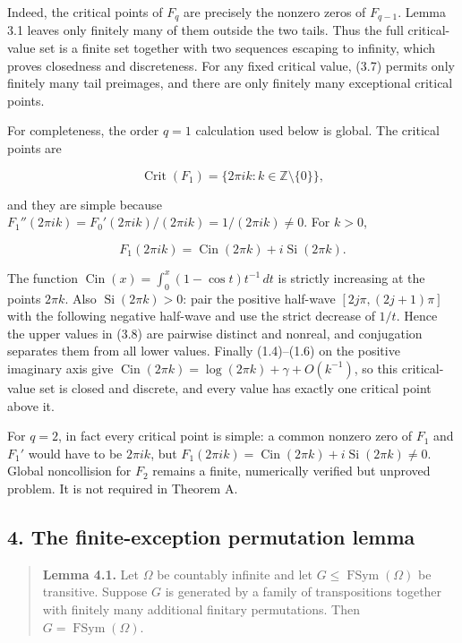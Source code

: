 Indeed, the critical points of \(F_q\) are precisely the nonzero zeros of
\(F_{q-1}\). Lemma 3.1 leaves only finitely many of them outside the two
tails. Thus the full critical-value set is a finite set together with two
sequences escaping to infinity, which proves closedness and discreteness.
For any fixed critical value, (3.7) permits only finitely many tail
preimages, and there are only finitely many exceptional critical points.

For completeness, the order \(q=1\) calculation used below is global. The
critical points are

\[
 \operatorname{Crit}(F_1)=\{2\pi ik:k\in\mathbb Z\setminus\{0\}\},
\]

and they are simple because
\(F_1''(2\pi ik)=F_0'(2\pi ik)/(2\pi ik)=1/(2\pi ik)\ne0\). For \(k>0\),

\[
 F_1(2\pi ik)=\operatorname{Cin}(2\pi k)
              +i\operatorname{Si}(2\pi k).
\tag{Inv-3.8}
\]

The function \(\operatorname{Cin}(x)=\int_0^x(1-\cos t)t^{-1}\,dt\) is
strictly increasing at the points \(2\pi k\). Also
\(\operatorname{Si}(2\pi k)>0\): pair the positive half-wave
\([2j\pi,(2j+1)\pi]\) with the following negative half-wave and use the
strict decrease of \(1/t\). Hence the upper values in (3.8) are pairwise
distinct and nonreal, and conjugation separates them from all lower values.
Finally (1.4)--(1.6) on the positive imaginary axis give
\(\operatorname{Cin}(2\pi k)=\log(2\pi k)+\gamma+O(k^{-1})\), so this critical-value set
is closed and discrete, and every value has exactly one critical point above
it.

For \(q=2\), in fact every critical point is simple: a common nonzero zero
of \(F_1\) and \(F_1'\) would have to be \(2\pi ik\), but
\(F_1(2\pi ik)=\operatorname{Cin}(2\pi k)+i\operatorname{Si}(2\pi k)\ne0\).
Global noncollision for \(F_2\) remains a finite, numerically verified but
unproved problem. It is not required in Theorem A.

\subsection{4. The finite-exception permutation lemma}

\begin{quote}
\textbf{Lemma 4.1.} Let \(\Omega\) be countably infinite and let
\(G\leq\operatorname{FSym}(\Omega)\) be transitive. Suppose \(G\) is
generated by a family of transpositions together with finitely many
additional finitary permutations. Then \(G=\operatorname{FSym}(\Omega)\).
\end{quote}

